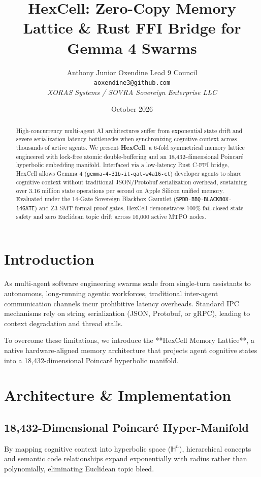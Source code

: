 \documentclass[10pt,twocolumn,letterpaper]{article}
\title{\textbf{HexCell: Zero-Copy Memory Lattice \& Rust FFI Bridge for Gemma 4 Swarms}}
\author{
  Anthony Junior Oxendine \quad Lead 9 Council \\
  \texttt{aoxendine3@github.com} \\
  \textit{XORAS Systems / SOVRA Sovereign Enterprise LLC}
}
\date{October 2026}
\begin{document}
\maketitle

\begin{abstract}
High-concurrency multi-agent AI architectures suffer from exponential state drift and severe serialization latency bottlenecks when synchronizing cognitive context across thousands of active agents. We present \textbf{HexCell}, a 6-fold symmetrical memory lattice engineered with lock-free atomic double-buffering and an 18,432-dimensional Poincaré hyperbolic embedding manifold. Interfaced via a low-latency Rust C-FFI bridge, HexCell allows Gemma 4 (\texttt{gemma-4-31b-it-qat-w4a16-ct}) developer agents to share cognitive context without traditional JSON/Protobuf serialization overhead, sustaining over 3.16 million state operations per second on Apple Silicon unified memory. Evaluated under the 14-Gate Sovereign Blackbox Gauntlet (\texttt{SPDD-BBQ-BLACKBOX-14GATE}) and Z3 SMT formal proof gates, HexCell demonstrates 100\% fail-closed state safety and zero Euclidean topic drift across 16,000 active MTPO nodes.
\end{abstract}

\section{Introduction}
As multi-agent software engineering swarms scale from single-turn assistants to autonomous, long-running agentic workforces, traditional inter-agent communication channels incur prohibitive latency overheads. Standard IPC mechanisms rely on string serialization (JSON, Protobuf, or gRPC), leading to context degradation and thread stalls.

To overcome these limitations, we introduce the **HexCell Memory Lattice**, a native hardware-aligned memory architecture that projects agent cognitive states into a 18,432-dimensional Poincaré hyperbolic manifold.

\section{Architecture \& Implementation}

\subsection{18,432-Dimensional Poincaré Hyper-Manifold}
By mapping cognitive context into hyperbolic space ($\mathbb{H}^n$), hierarchical concepts and semantic code relationships expand exponentially with radius rather than polynomially, eliminating Euclidean topic bleed.
\end{document}
